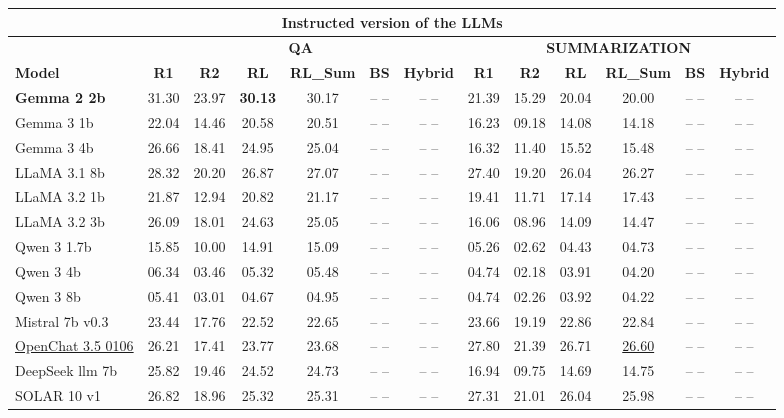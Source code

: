 \begin{table}[ht]
\begin{tabular}{lcccccc|cccccc}
\midrule
\multicolumn{13}{c}{\textbf{Instructed version of the LLMs}}  \\

\midrule
 & \multicolumn{6}{c|}{\textbf{QA}} & \multicolumn{6}{c}{\textbf{SUMMARIZATION}} \\
\midrule

\textbf{Model} & \textbf{R1} & \textbf{R2} & \textbf{RL} & \textbf{RL\_Sum} & \textbf{BS} & \textbf{Hybrid} & \textbf{R1} & \textbf{R2} & \textbf{RL} & \textbf{RL\_Sum} & \textbf{BS} & \textbf{Hybrid} \\
\midrule

\textbf{Gemma 2 2b} & 31.30 & 23.97 & \textbf{30.13} & 30.17 & -- -- & -- -- & 21.39 & 15.29 & 20.04 & 20.00 & -- -- & -- -- \\
Gemma 3 1b & 22.04 & 14.46 & 20.58 & 20.51 & -- -- & -- -- & 16.23 & 09.18 & 14.08 & 14.18 & -- -- & -- -- \\
Gemma 3 4b & 26.66 & 18.41 & 24.95 & 25.04 & -- -- & -- -- & 16.32 & 11.40 & 15.52 & 15.48 & -- -- & -- -- \\
LLaMA 3.1 8b & 28.32 & 20.20 & 26.87 & 27.07 & -- -- & -- -- & 27.40 & 19.20 & 26.04 & 26.27 & -- -- & -- -- \\
LLaMA 3.2 1b & 21.87 & 12.94 & 20.82 & 21.17 & -- -- & -- -- & 19.41 & 11.71 & 17.14 & 17.43 & -- -- & -- -- \\
LLaMA 3.2 3b & 26.09 & 18.01 & 24.63 & 25.05 & -- -- & -- -- & 16.06 & 08.96 & 14.09 & 14.47 & -- -- & -- -- \\
Qwen 3 1.7b & 15.85 & 10.00 & 14.91 & 15.09 & -- -- & -- -- & 05.26 & 02.62 & 04.43 & 04.73 & -- -- & -- -- \\
Qwen 3 4b & 06.34 & 03.46 & 05.32 & 05.48 & -- -- & -- -- & 04.74 & 02.18 & 03.91 & 04.20 & -- -- & -- -- \\
Qwen 3 8b & 05.41 & 03.01 & 04.67 & 04.95 & -- -- & -- -- & 04.74 & 02.26 & 03.92 & 04.22 & -- -- & -- -- \\
Mistral 7b v0.3 & 23.44 & 17.76 & 22.52 & 22.65 & -- -- & -- -- & 23.66 & 19.19 & 22.86 & 22.84 & -- -- & -- -- \\
\underline{OpenChat 3.5 0106} & 26.21 & 17.41 & 23.77 & 23.68 & -- -- & -- -- & 27.80 & 21.39 & 26.71 & \underline{26.60} & -- -- & -- -- \\
DeepSeek llm 7b & 25.82 & 19.46 & 24.52 & 24.73 & -- -- & -- -- & 16.94 & 09.75 & 14.69 & 14.75 & -- -- & -- -- \\
SOLAR 10 v1 & 26.82 & 18.96 & 25.32 & 25.31 & -- -- & -- -- & 27.31 & 21.01 & 26.04 & 25.98 & -- -- & -- -- \\

\end{tabular}
\end{table}
